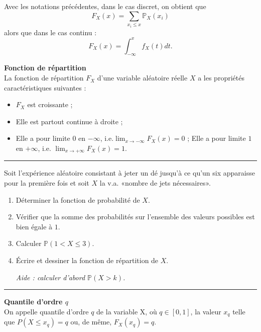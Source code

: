 \documentclass[../PolyS4.tex]{subfiles}
\begin{document}
\begin{Prop}
Avec les notations précédentes, dans le cas discret, on obtient que
$$F_X (x) = \sum_{x_i\leq x} \mathbb{P}_X (x_i)$$
alors que dans le cas continu :
$$F_X (x) =
\int^x_{-\infty}
f_X (t) dt.$$
\end{Prop}



\begin{Thm}
\textbf{Fonction de répartition}\\
 La fonction de répartition $F_X$ d'une variable aléatoire réelle $X$ a les propriétés caractéristiques suivantes :
\begin{itemize}
  \item  $F_X$ est croissante ;
   \item Elle est partout continue à droite ;
     \item Elle a pour limite $0$ en $\displaystyle -\infty $, i.e.$\displaystyle \lim _{x\to -\infty }F_{X}(x)=0$ ;
    Elle a pour limite $1$ en $\displaystyle +\infty $, i.e. $\displaystyle \lim _{x\to +\infty }F_{X}(x)=1$.
    \end{itemize}
\end{Thm}


\vspace{1em}
\hrule
\vspace{1em}


Soit l'expérience aléatoire consistant à jeter un dé jusqu'à ce qu'un six apparaisse pour la première fois et soit $X$ la v.a. «nombre de jets nécessaires». 

\begin{enumerate}
\item Déterminer la fonction de probabilité de $X$.
\item Vérifier que la somme des probabilités sur l'ensemble des valeurs possibles est bien égale à $1$. 
\item Calculer $\mathbb{P}(1 < X \leq 3)$.
\item Écrire et dessiner la fonction de répartition de $X$.

\textit{Aide : calculer d'abord $\mathbb{P}(X > k)$.}
\end{enumerate}

\vspace{1em}
\hrule
\vspace{1em}


\begin{Def}
{\textbf{Quantile d'ordre $q$}\\}
On appelle quantile d'ordre $q$ de la variable X, o\`u $q \in [0, 1]$,
la valeur $x_q$ telle que $P(X \leq x_q) = q$ ou, de m\^eme, $F_X(x_q) = q$.
\end{Def}
\end{document}
